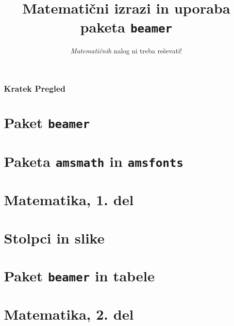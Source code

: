 \documentclass{beamer}
\theoremstyle{definition}
\theoremstyle{plain}
\begin{document}
\title{Matematični izrazi in uporaba paketa \texttt{beamer}}
\subtitle{\emph{Matematičnih} nalog ni treba reševati!}
\date{}


\begin{frame}
    \frametitle{Kratek Pregled}
    \tableofcontents %
\end{frame}

\section{Paket \texttt{beamer}}



\section{Paketa \texttt{amsmath} in \texttt{amsfonts}}



\section[Matematika, 1. del\\\large{Analiza, logika, množice}]{Matematika, 1. del}



\section{Stolpci in slike}



\section{Paket \texttt{beamer} in tabele}



\section[Matematika, 2. del\\\large{Zaporedja, algebra, grupe}]{Matematika, 2. del}


\end{document}
